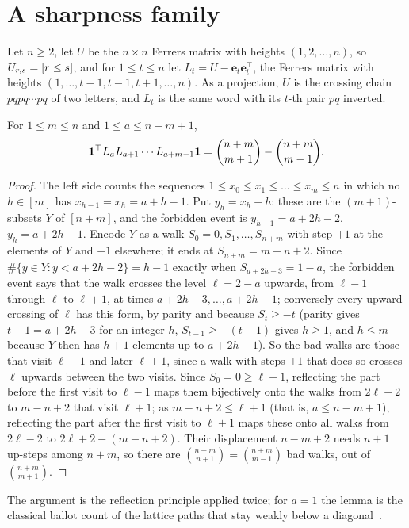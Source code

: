 \documentclass[11pt,a4paper]{article}
\newcommand{\Lt}[1]{L_{#1}}
\newcommand{\Umat}{U}
\newcommand{\ee}[1]{\mathbf{e}_{#1}}
\begin{document}
\section{A sharpness family}\label{sec:family}

Let $n\ge2$, let $\Umat$ be the $n\times n$ Ferrers matrix with heights $(1,2,\dots,n)$, so $\Umat_{r,s}=\iver{r\le s}$, and for $1\le t\le n$ let $\Lt{t}=\Umat-\ee{t}\ee{t}^{\top}$, the Ferrers matrix with heights $(1,\dots,t-1,t-1,t+1,\dots,n)$. As a projection, $\Umat$ is the crossing chain $pqpq\cdots pq$ of two letters, and $\Lt{t}$ is the same word with its $t$-th pair $pq$ inverted.

\begin{lemma}\label{lem:ballot}
For $1\le m\le n$ and $1\le a\le n-m+1$,
\[
\one^{\top}\Lt{a}\Lt{a+1}\cdots\Lt{a+m-1}\one=\binom{n+m}{m+1}-\binom{n+m}{m-1}.
\]
\end{lemma}

\begin{proof}
The left side counts the sequences $1\le x_0\le x_1\le\dots\le x_m\le n$ in which no $h\in[m]$ has $x_{h-1}=x_h=a+h-1$. Put $y_h=x_h+h$: these are the $(m+1)$-subsets $Y$ of $[n+m]$, and the forbidden event is $y_{h-1}=a+2h-2$, $y_h=a+2h-1$. Encode $Y$ as a walk $S_0=0,S_1,\dots,S_{n+m}$ with step $+1$ at the elements of $Y$ and $-1$ elsewhere; it ends at $S_{n+m}=m-n+2$. Since $\#\{y\in Y:y<a+2h-2\}=h-1$ exactly when $S_{a+2h-3}=1-a$, the forbidden event says that the walk crosses the level $\ell=2-a$ upwards, from $\ell-1$ through $\ell$ to $\ell+1$, at times $a+2h-3,\dots,a+2h-1$; conversely every upward crossing of $\ell$ has this form, by parity and because $S_t\ge-t$ (parity gives $t-1=a+2h-3$ for an integer $h$, $S_{t-1}\ge-(t-1)$ gives $h\ge1$, and $h\le m$ because $Y$ then has $h+1$ elements up to $a+2h-1$). So the bad walks are those that visit $\ell-1$ and later $\ell+1$, since a walk with steps $\pm1$ that does so crosses $\ell$ upwards between the two visits. Since $S_0=0\ge\ell-1$, reflecting the part before the first visit to $\ell-1$ maps them bijectively onto the walks from $2\ell-2$ to $m-n+2$ that visit $\ell+1$; as $m-n+2\le\ell+1$ (that is, $a\le n-m+1$), reflecting the part after the first visit to $\ell+1$ maps these onto all walks from $2\ell-2$ to $2\ell+2-(m-n+2)$. Their displacement $n-m+2$ needs $n+1$ up-steps among $n+m$, so there are $\binom{n+m}{n+1}=\binom{n+m}{m-1}$ bad walks, out of $\binom{n+m}{m+1}$.
\end{proof}

The argument is the reflection principle applied twice; for $a=1$ the lemma is the classical ballot count of the lattice paths that stay weakly below a diagonal~\cite[Theorem~10.3.1]{Kra15}.
\end{document}
